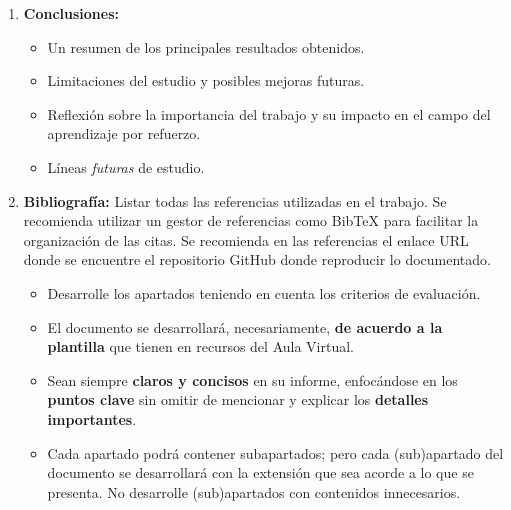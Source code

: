 \documentclass[a4paper, 11pt]{article}
\begin{document}
\begin{enumerate}
    \begin{itemize}
        \item Configuración experimental: herramientas, entornos de prueba, datasets empleados, etc.
        \item Métricas utilizadas para evaluar el desempeño del método propuesto.
        \item Resultados obtenidos, presentados en tablas o gráficos según corresponda.
        \item Análisis crítico de los resultados y comparación con otros enfoques.
    \end{itemize}
    \item \textbf{Conclusiones:}
    \begin{itemize}
        \item Un resumen de los principales resultados obtenidos.
        \item Limitaciones del estudio y posibles mejoras futuras.
        \item Reflexión sobre la importancia del trabajo y su impacto en el campo del aprendizaje por refuerzo.
        \item Líneas \textit{futuras} de estudio.
    \end{itemize}
    \item \textbf{Bibliografía:} Listar todas las referencias utilizadas en el trabajo. Se recomienda utilizar un gestor de referencias como BibTeX para facilitar la organización de las citas. Se recomienda en las referencias el enlace URL donde se encuentre el repositorio GitHub donde reproducir lo documentado.
    
\begin{importantbox}
\begin{itemize}
\item Desarrolle los apartados teniendo en cuenta los criterios de evaluación.

\item El documento se desarrollará, necesariamente, \textbf{\color{red} de acuerdo a la plantilla} que tienen en recursos del Aula Virtual.

\item Sean siempre \textbf{claros y concisos} en su informe, enfocándose en los \textbf{puntos clave} sin omitir de mencionar y explicar los \textbf{detalles importantes}. 


\item Cada apartado podrá contener subapartados; pero cada (sub)apartado del documento se desarrollará con la extensión que sea acorde a lo que se presenta. No desarrolle (sub)apartados con contenidos innecesarios. 


\end{itemize}
\end{importantbox}
\end{enumerate}
\end{document}
